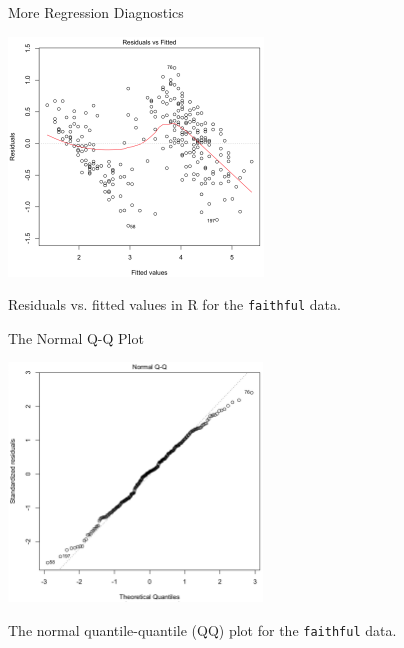 \begin{frame}{More Regression Diagnostics}
    \vspace{-0.5cm}\begin{center}
        \includegraphics[height=2.5in]{images/residfaith.png}
    \end{center}
    Residuals vs. fitted values in R for the \texttt{faithful} data.
\end{frame}

\begin{frame}{The Normal Q-Q Plot}
    \vspace{-0.5cm}\begin{center}
        \includegraphics[height=2.5in]{images/qqplot.png}
    \end{center}
    The normal quantile-quantile (QQ) plot for the \texttt{faithful} data.
\end{frame}

